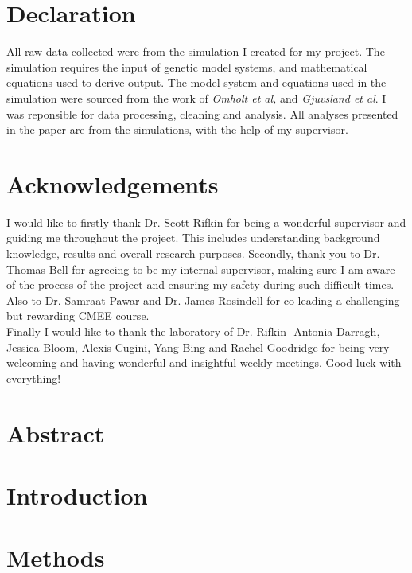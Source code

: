 \documentclass[11pt]{article}
\begin{document}


\newpage

\section{Declaration}
All raw data collected were from the simulation I created for my project. The simulation requires the input of genetic model systems, and mathematical equations used to derive output. The model system and equations used in the simulation were sourced from the work of \textit{Omholt et al,} and \textit{Gjuvsland et al}. I was reponsible for data processing, cleaning and analysis. All analyses presented in the paper are from the simulations, with the help of my supervisor.

\section{Acknowledgements}
I would like to firstly thank Dr. Scott Rifkin for being a wonderful supervisor and guiding me throughout the project. This includes understanding background knowledge, results and overall research purposes. Secondly, thank you to Dr. Thomas Bell for agreeing to be my internal supervisor, making sure I am aware of the process of the project and ensuring my safety during such difficult times. Also to Dr. Samraat Pawar and Dr. James Rosindell for co-leading a challenging but rewarding CMEE course.
\\Finally I would like to thank the laboratory of Dr. Rifkin- Antonia Darragh, Jessica Bloom, Alexis Cugini, Yang Bing and Rachel Goodridge for being very welcoming and having wonderful and insightful weekly meetings. Good luck with everything!

\newpage

\section{Abstract}

\newpage

\section{Introduction}


\newpage

\section{Methods}

\end{document}
